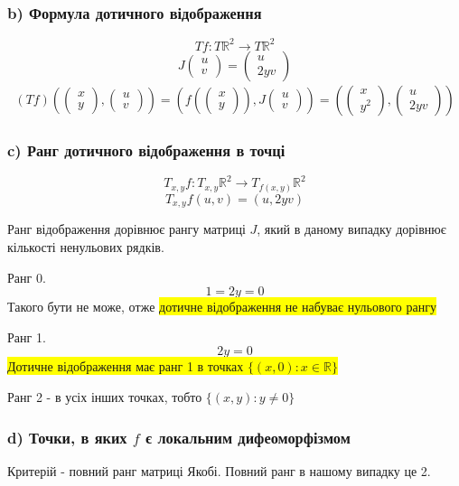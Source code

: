\documentclass[10pt, a4paper]{article} %
\newcommand{\R}{\mathbb{R}}
\begin{document}
\subsubsection*{b) Формула дотичного відображення}
\[Tf : T\R^2 \to T\R^2\]
\[J\begin{pmatrix}u\\v\end{pmatrix} = \begin{pmatrix}u\\2yv\end{pmatrix}\]
\begin{align*}
    (Tf)\left(\begin{pmatrix}x\\y\end{pmatrix} , \begin{pmatrix}u\\v\end{pmatrix}\right)
    = \left(f(\begin{pmatrix}x\\y\end{pmatrix}) , J\begin{pmatrix}u\\v\end{pmatrix}\right)
    = \left(\begin{pmatrix}x\\y^2\end{pmatrix} , \begin{pmatrix}u\\2yv\end{pmatrix}\right)
\end{align*}

\subsubsection*{c) Ранг дотичного відображення в точці}
\[T_{x,y}f : T_{x,y}\R^2 \to T_{f(x,y)}\R^2\]
\[T_{x,y}f(u,v) = (u, 2yv)\]

Ранг відображення дорівнює рангу матриці $J$, який в даному випадку дорівнює кількості ненульових рядків.

Ранг 0.
\[1=2y=0\]
Такого бути не може, отже \colorbox{yellow}{дотичне відображення не набуває нульового рангу}

Ранг 1.
\[2y=0\]
\colorbox{yellow}{Дотичне відображення має ранг 1 в точках $\{(x,0) : x\in\R\}$}

Ранг 2 - в усіх інших точках, тобто $\{(x,y) : y\ne 0\}$

\subsubsection*{d) Точки, в яких $f$ є локальним дифеоморфізмом}
Критерій - повний ранг матриці Якобі.
Повний ранг в нашому випадку це 2.
\end{document}
